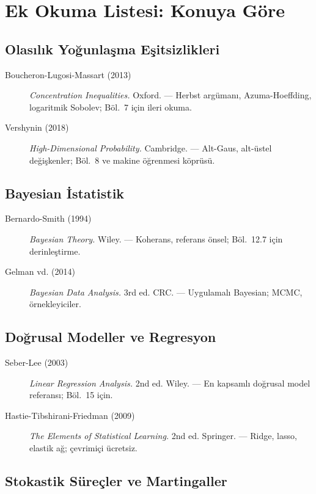 \section{Ek Okuma Listesi: Konuya Göre}

\subsection{Olasılık Yoğunlaşma Eşitsizlikleri}

\begin{description}
  \item[Boucheron-Lugosi-Massart (2013)] \textit{Concentration Inequalities.} Oxford. — Herbst argümanı, Azuma-Hoeffding, logaritmik Sobolev; Böl.~7 için ileri okuma.
  \item[Vershynin (2018)] \textit{High-Dimensional Probability.} Cambridge. — Alt-Gaus, alt-üstel değişkenler; Böl.~8 ve makine öğrenmesi köprüsü.
\end{description}

\subsection{Bayesian İstatistik}

\begin{description}
  \item[Bernardo-Smith (1994)] \textit{Bayesian Theory.} Wiley. — Koherans, referans önsel; Böl.~12.7 için derinleştirme.
  \item[Gelman vd. (2014)] \textit{Bayesian Data Analysis.} 3rd ed. CRC. — Uygulamalı Bayesian; MCMC, örnekleyiciler.
\end{description}

\subsection{Doğrusal Modeller ve Regresyon}

\begin{description}
  \item[Seber-Lee (2003)] \textit{Linear Regression Analysis.} 2nd ed. Wiley. — En kapsamlı doğrusal model referansı; Böl.~15 için.
  \item[Hastie-Tibshirani-Friedman (2009)] \textit{The Elements of Statistical Learning.} 2nd ed. Springer. — Ridge, lasso, elastik ağ; çevrimiçi ücretsiz.
\end{description}

\subsection{Stokastik Süreçler ve Martingaller}

